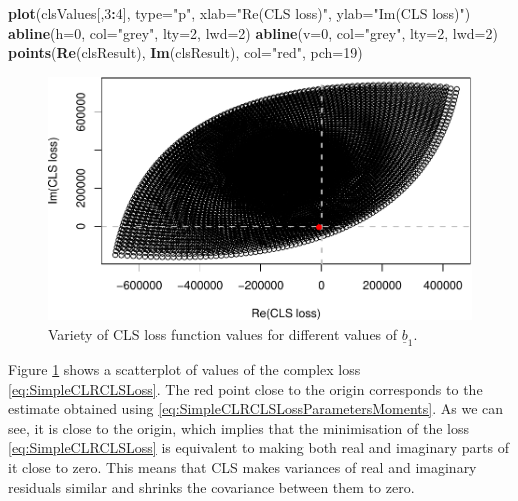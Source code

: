 \documentclass[
]{book}
\newenvironment{Shaded}{\begin{snugshade}}{\end{snugshade}}
\newcommand{\DataTypeTok}[1]{\textcolor[rgb]{0.13,0.29,0.53}{#1}}
\newcommand{\DecValTok}[1]{\textcolor[rgb]{0.00,0.00,0.81}{#1}}
\newcommand{\KeywordTok}[1]{\textcolor[rgb]{0.13,0.29,0.53}{\textbf{#1}}}
\newcommand{\NormalTok}[1]{#1}
\newcommand{\OperatorTok}[1]{\textcolor[rgb]{0.81,0.36,0.00}{\textbf{#1}}}
\newcommand{\StringTok}[1]{\textcolor[rgb]{0.31,0.60,0.02}{#1}}
\begin{document}
\begin{Shaded}
\begin{Highlighting}[]
\KeywordTok{plot}\NormalTok{(clsValues[,}\DecValTok{3}\OperatorTok{:}\DecValTok{4}\NormalTok{], }\DataTypeTok{type=}\StringTok{"p"}\NormalTok{,}
     \DataTypeTok{xlab=}\StringTok{"Re(CLS loss)"}\NormalTok{, }\DataTypeTok{ylab=}\StringTok{"Im(CLS loss)"}\NormalTok{)}
\KeywordTok{abline}\NormalTok{(}\DataTypeTok{h=}\DecValTok{0}\NormalTok{, }\DataTypeTok{col=}\StringTok{"grey"}\NormalTok{, }\DataTypeTok{lty=}\DecValTok{2}\NormalTok{, }\DataTypeTok{lwd=}\DecValTok{2}\NormalTok{)}
\KeywordTok{abline}\NormalTok{(}\DataTypeTok{v=}\DecValTok{0}\NormalTok{, }\DataTypeTok{col=}\StringTok{"grey"}\NormalTok{, }\DataTypeTok{lty=}\DecValTok{2}\NormalTok{, }\DataTypeTok{lwd=}\DecValTok{2}\NormalTok{)}
\KeywordTok{points}\NormalTok{(}\KeywordTok{Re}\NormalTok{(clsResult), }\KeywordTok{Im}\NormalTok{(clsResult), }\DataTypeTok{col=}\StringTok{"red"}\NormalTok{, }\DataTypeTok{pch=}\DecValTok{19}\NormalTok{)}
\end{Highlighting}
\end{Shaded}

\begin{figure}
\centering
\includegraphics{Svetunkov---Svetunkov---Complex-Valued-Econometrics_files/figure-latex/clsScatter-1.pdf}
\caption{\label{fig:clsScatter}Variety of CLS loss function values for different values of \(\underline{b}_1\).}
\end{figure}

Figure \ref{fig:clsScatter} shows a scatterplot of values of the complex loss \eqref{eq:SimpleCLRCLSLoss}. The red point close to the origin corresponds to the estimate obtained using \eqref{eq:SimpleCLRCLSLossParametersMoments}. As we can see, it is close to the origin, which implies that the minimisation of the loss \eqref{eq:SimpleCLRCLSLoss} is equivalent to making both real and imaginary parts of it close to zero. This means that CLS makes variances of real and imaginary residuals similar and shrinks the covariance between them to zero.
\end{document}
